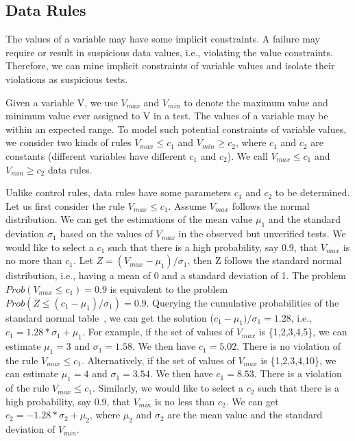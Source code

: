 \documentclass{sig-alternate}
\begin{document}
\subsection{Data Rules}

The values of a variable may have some implicit constraints. A
failure may require or result in suspicious data values, i.e.,
violating the value constraints. Therefore, we can mine implicit
constraints of variable values and isolate their violations as
suspicious tests.

Given a variable V, we use $V_{max}$ and $V_{min}$ to denote the
maximum value and minimum value ever assigned to V in a test. The
values of a variable may be within an expected range. To model such
potential constraints of variable values, we consider two kinds of
rules $V_{max}\le c_1$ and $V_{min}\ge c_2$, where $c_1$ and $c_2$
are constants (different variables have different $c_1$ and $c_2$).
We call $V_{max}\le c_1$ and $V_{min}\ge c_2$ data rules.


Unlike control rules, data rules have some parameters $c_1$ and
$c_2$ to be determined. Let us first consider the rule $V_{max}\le
c_1$. Assume $V_{max}$ follows the normal distribution. We can get
the estimations of the mean value $\mu_1$ and the standard deviation
$\sigma_1$ based on the values of $V_{max}$ in the observed but
unverified tests. We would like to select a $c_1$ such that there is
a high probability, say 0.9, that $V_{max}$ is no more than $c_1$.
Let $Z=(V_{max}-\mu_1) / \sigma_1$, then Z follows the standard
normal distribution, i.e., having a mean of 0 and a standard
deviation of 1. The problem $Prob(V_{max}\le c_1)=0.9$ is equivalent
to the problem $Prob(Z\le (c_1-\mu_1)/\sigma_1)=0.9$.
Querying the cumulative probabilities of the standard normal
table~\cite{Normal}, we can get the solution
($c_1-\mu_1)/\sigma_1=1.28$, i.e., $c_1=1.28*\sigma_1+\mu_1$. For
example, if the set of values of $V_{max}$ is \{1,2,3,4,5\}, we can
estimate $\mu_1=3$ and $\sigma_1=1.58$. We then have $c_1=5.02$.
There is no violation of the rule $V_{max}\le c_1$. Alternatively,
if the set of values of $V_{max}$ is \{1,2,3,4,10\}, we can estimate
$\mu_1=4$ and $\sigma_1=3.54$. We then have $c_1=8.53$. There is a
violation of the rule $V_{max}\le c_1$. Similarly, we would like to
select a $c_2$ such that there is a high probability, say 0.9, that
$V_{min}$ is no less than $c_2$. We can get
$c_2=-1.28*\sigma_2+\mu_2$, where $\mu_2$ and $\sigma_2$ are the
mean value and the standard deviation of $V_{min}$.
\end{document}

